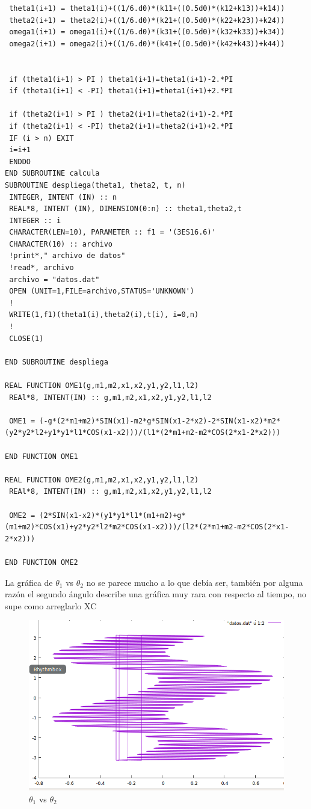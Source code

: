 \documentclass[12pt,a4paper]{article}
\begin{document}
\begin{verbatim}
 theta1(i+1) = theta1(i)+((1/6.d0)*(k11+((0.5d0)*(k12+k13))+k14))
 theta2(i+1) = theta2(i)+((1/6.d0)*(k21+((0.5d0)*(k22+k23))+k24))
 omega1(i+1) = omega1(i)+((1/6.d0)*(k31+((0.5d0)*(k32+k33))+k34))
 omega2(i+1) = omega2(i)+((1/6.d0)*(k41+((0.5d0)*(k42+k43))+k44))
 

 if (theta1(i+1) > PI ) theta1(i+1)=theta1(i+1)-2.*PI
 if (theta1(i+1) < -PI) theta1(i+1)=theta1(i+1)+2.*PI
 
 if (theta2(i+1) > PI ) theta2(i+1)=theta2(i+1)-2.*PI
 if (theta2(i+1) < -PI) theta2(i+1)=theta2(i+1)+2.*PI
 IF (i > n) EXIT
 i=i+1
 ENDDO
END SUBROUTINE calcula
SUBROUTINE despliega(theta1, theta2, t, n)
 INTEGER, INTENT (IN) :: n
 REAL*8, INTENT (IN), DIMENSION(0:n) :: theta1,theta2,t
 INTEGER :: i
 CHARACTER(LEN=10), PARAMETER :: f1 = '(3ES16.6)'
 CHARACTER(10) :: archivo
 !print*," archivo de datos"
 !read*, archivo
 archivo = "datos.dat"
 OPEN (UNIT=1,FILE=archivo,STATUS='UNKNOWN')
 !
 WRITE(1,f1)(theta1(i),theta2(i),t(i), i=0,n)
 !
 CLOSE(1)

END SUBROUTINE despliega

REAL FUNCTION OME1(g,m1,m2,x1,x2,y1,y2,l1,l2)
 REAl*8, INTENT(IN) :: g,m1,m2,x1,x2,y1,y2,l1,l2

 OME1 = (-g*(2*m1+m2)*SIN(x1)-m2*g*SIN(x1-2*x2)-2*SIN(x1-x2)*m2*(y2*y2*l2+y1*y1*l1*COS(x1-x2)))/(l1*(2*m1+m2-m2*COS(2*x1-2*x2)))

END FUNCTION OME1

REAL FUNCTION OME2(g,m1,m2,x1,x2,y1,y2,l1,l2)
 REAl*8, INTENT(IN) :: g,m1,m2,x1,x2,y1,y2,l1,l2

 OME2 = (2*SIN(x1-x2)*(y1*y1*l1*(m1+m2)+g*(m1+m2)*COS(x1)+y2*y2*l2*m2*COS(x1-x2)))/(l2*(2*m1+m2-m2*COS(2*x1-2*x2)))
 
END FUNCTION OME2
\end{verbatim}

La gráfica de $\theta_1$ vs $\theta_2$ no se parece mucho a lo que debía ser, también por alguna razón el segundo ángulo describe una gráfica muy rara con respecto al tiempo, no supe como arreglarlo XC

\begin{figure}
    \centering
    \includegraphics[scale=0.8]{1.PNG}
    \caption{$\theta_1$ vs $\theta_2$}
\end{figure}
\end{document}
